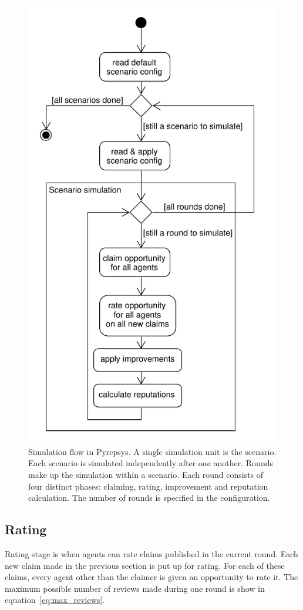 \documentclass[%
    ]{\PathToTumTemplate/thesis/tum_thesis}
\begin{document}
\begin{figure}[tbp]
  \begin{center}
        \includegraphics[width=0.75\linewidth]	{../uml/simulation_flow.pdf}
    \caption{
    Simulation flow in Pyrepsys.
    A single simulation unit is the \gls{scenario}.
    Each \gls{scenario} is simulated independently after one another.
    Rounds make up the simulation within a \gls{scenario}.
    Each round consists of four distinct phases: claiming, rating, improvement and reputation calculation.
    The number of rounds is specified in the configuration.
    }
    \label{fig:simulation_flow}
  \end{center}
\end{figure}


\subsection{Rating}

Rating stage is when agents can rate claims published in the current round.
Each new claim made in the previous section is put up for rating.
For each of these claims, every agent other than the claimer is given an opportunity to rate it.
The maximum possible number of \glspl{review} made during one round is show in equation~\ref{eq:max_reviews}.
\end{document}
